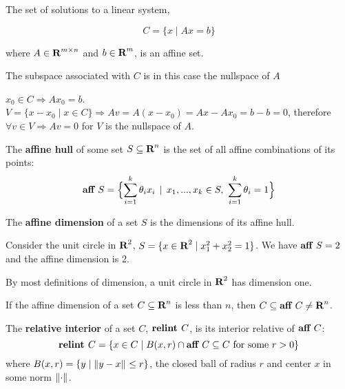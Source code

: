 \begin{Fact}
  The set of solutions to a linear system,

  \begin{equation}
    \label{eq:linear_system_affine}
    C = \{x \mid Ax=b\}
  \end{equation}
  
  where $A\in\textbf{R}^{m\times n}$ and $b\in\textbf{R}^m$, is an affine set.

  The subspace associated with $C$ is in this case the nullspace of $A$

  \begin{Proof}
    $x_0\in C\Rightarrow Ax_0=b$. $V=\{x-x_0 \mid x\in C\}\Rightarrow Av = A(x-x_0) =
    Ax-Ax_0=b-b=0$, therefore $\forall v\in V\Rightarrow Av = 0$ for $V$ is the
    nullspace of $A$.
  \end{Proof}
\end{Fact}

\begin{Definition}
  The \textbf{affine hull} of some set $S\subseteq \textbf{R}^n$ is the set of all
  affine combinations of its points:
  \begin{equation*}
    \textbf{aff }S = \Bigl\{\sum_{i=1}^k\theta_ix_i \, \mid \, x_1,...,x_k\in S,\,\,\sum_{i=1}^k\theta_i=1\Bigr\}
  \end{equation*}
\end{Definition}

\begin{Definition}
  The \textbf{affine dimension} of a set $S$ is the dimensions of its affine
  hull.
\end{Definition}

\begin{Example}
  Consider the unit circle in $\textbf{R}^2$, $S = \{x\in\textbf{R}^2 \mid x_1^2+x_2^2 =
  1\}$. We have $\textbf{aff }S = 2$ and the affine dimension is 2.

  \begin{Fact}
    By most definitions of dimension, a unit circle in $\textbf{R}^2$ has
    dimension one.
  \end{Fact}
\end{Example}

\begin{Fact}
  If the affine dimension of a set $C\subseteq \textbf{R}^n$ is less than $n$, then
  $C\subseteq \textbf{aff }C\ne\textbf{R}^n$.
\end{Fact}

\begin{Definition}
  The \textbf{relative interior} of a set $C$, $\textbf{relint }C$, is its interior
  relative of $\textbf{aff }C$:
  \begin{equation*}
    \textbf{relint }C = \{
    x\in C \mid B(x,r)\cap\textbf{aff }C\subseteq C\text{ for some }r>0
    \}
  \end{equation*}
  where $B(x,r) = \{y \mid \left\|y-x\right\|_{}\le r\}$, the closed ball of radius $r$ and
  center $x$ in some norm $\left\|\cdot\right\|_{}$.
\end{Definition}

